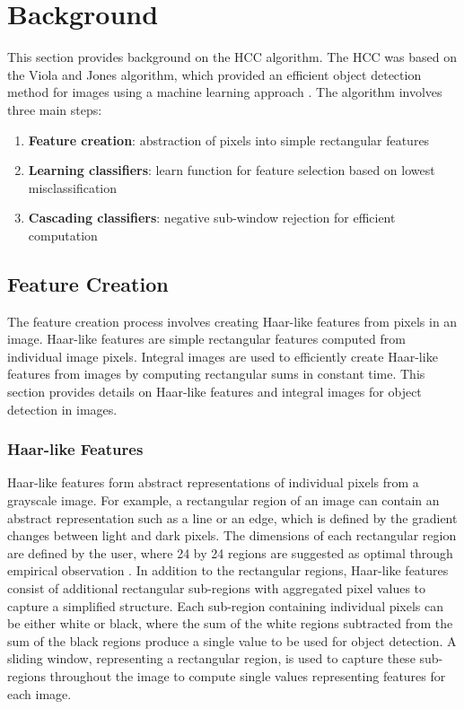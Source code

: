 \section{Background} \label{background}

This section provides background on the HCC algorithm. The HCC was based on the Viola and Jones algorithm, which provided an efficient object detection method for images using a machine learning approach \cite{Viola:2001}. The algorithm involves three main steps:

\begin{enumerate}
  \item \textbf{Feature creation}: abstraction of pixels into simple rectangular features
  \item \textbf{Learning classifiers}: learn function for feature selection based on lowest misclassification
  \item \textbf{Cascading classifiers}: negative sub-window rejection for efficient computation
\end{enumerate}

\subsection{Feature Creation} \label{feature-creation}

The feature creation process involves creating Haar-like features from pixels in an image. Haar-like features are simple rectangular features computed from individual image pixels. Integral images are used to efficiently create Haar-like features from images by computing rectangular sums in constant time. This section provides details on Haar-like features and integral images for object detection in images.

\subsubsection{Haar-like Features} \label{haar-like-features}

Haar-like features form abstract representations of individual pixels from a grayscale image. For example, a rectangular region of an image can contain an abstract representation such as a line or an edge, which is defined by the gradient changes between light and dark pixels. The dimensions of each rectangular region are defined by the user, where 24 by 24 regions are suggested as optimal through empirical observation \cite{Viola:2001}. In addition to the rectangular regions, Haar-like features consist of additional rectangular sub-regions with aggregated pixel values to capture a simplified structure. Each sub-region containing individual pixels can be either white or black, where the sum of the white regions subtracted from the sum of the black regions produce a single value to be used for object detection. A sliding window, representing a rectangular region, is used to capture these sub-regions throughout the image to compute single values representing features for each image.

